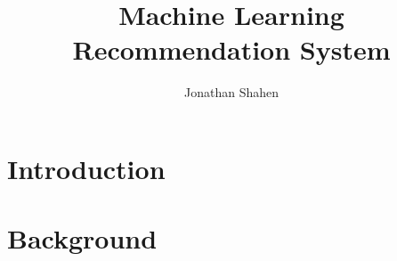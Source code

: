 \documentclass[10pt,a4paper]{article}
\title{Machine Learning Recommendation System}
\author{Jonathan Shahen}
\begin{document}
\maketitle

\section{Introduction}


\section{Background}
\end{document}

